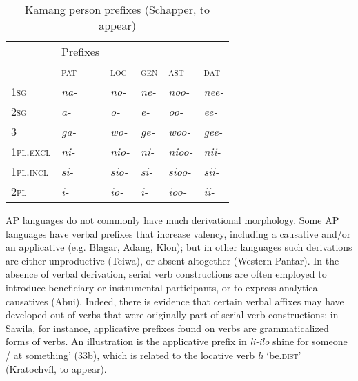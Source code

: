 \begin{table}\centering


\begin{tabular}{lllllll}
\multicolumn{1}{l}{} & \multicolumn{1}{l}{ Prefixes} & \multicolumn{5}{l}{}\\
& \multicolumn{2}{l}{{\scshape pat}} & {\scshape loc} & {\scshape gen} & \textsc{ast}\footnotemark{} & {\scshape dat}\\
\hline
{\scshape 1sg} & \multicolumn{2}{l}{{\itshape na-}

} & {\itshape no-} & {\itshape ne-} & {\itshape noo-} & {\itshape nee-}\\
{\scshape 2sg} & \multicolumn{2}{l}{{\itshape a-}

} & {\itshape o-} & {\itshape e-} & {\itshape oo-} & {\itshape ee-}\\
3 & \multicolumn{2}{l}{{\itshape ga-}

} & {\itshape wo-} & {\itshape ge-} & {\itshape woo-} & {\itshape gee-}\\
{\scshape 1pl.excl} & \multicolumn{2}{l}{{\itshape ni-}

} & {\itshape nio-} & {\itshape ni-} & {\itshape nioo-} & {\itshape nii-}\\
{\scshape 1pl.incl} & \multicolumn{2}{l}{{\itshape si-}

} & {\itshape sio-} & {\itshape si-} & {\itshape sioo-} & {\itshape sii-}\\
{\scshape 2pl} & \multicolumn{2}{l}{{\itshape i-}

} & {\itshape io-} & {\itshape i-} & {\itshape ioo-} & {\itshape ii-}\\
\end{tabular}

\caption{ Kamang person prefixes (Schapper, to appear)}
\end{table}

AP languages do not commonly have much derivational morphology. Some AP languages have verbal prefixes that increase valency, including a causative and/or an applicative (e.g. Blagar, Adang, Klon); but in other languages such derivations are either unproductive (Teiwa), or absent altogether (Western Pantar). In the absence of verbal derivation, serial verb constructions are often employed to introduce beneficiary or instrumental participants, or to express analytical causatives (Abui). Indeed, there is evidence that certain verbal affixes may have developed out of verbs that were originally part of serial verb constructions: in Sawila, for instance, applicative prefixes found on verbs are grammaticalized forms of verbs. An illustration is the applicative prefix   in \textit{li-ilo} shine for someone / at something' (33b), which is related to the locative verb \textit{li} `be.\textsc{dist}' (Kratochv\'il, to appear).


